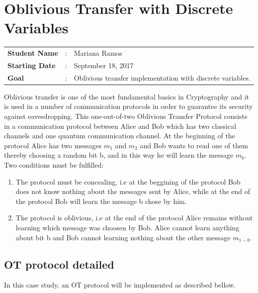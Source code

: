 \clearpage
\section{Oblivious Transfer with Discrete Variables}

\begin{tcolorbox}	
\begin{tabular}{p{2.75cm} p{0.2cm} p{10.5cm}} 	
\textbf{Student Name}  &:& Mariana Ramos\\
\textbf{Starting Date} &:& September 18, 2017\\
\textbf{Goal}          &:& Oblivious transfer implementation with discrete variables.
\end{tabular}
\end{tcolorbox}

Oblivious transfer is one of the most fundamental basics in Cryptography and it is used in a number of communication protocols in order to guarantee its security against eavesdropping. This one-out-of-two Oblivious Transfer Protocol consists in a communication protocol between Alice and Bob which has two classical channels and one quantum communication channel. At the beginning of the protocol Alice has two messages $m_1$ and $m_2$ and Bob wants to read one of them thereby choosing a random bit b, and in this way he will learn the message $m_{b}$. Two conditions must be fulfilled:
\begin{enumerate}
	\item{The protocol must be concealing, i.e at the beggining of the protocol Bob does not know nothing about the messages sent by Alice, while at the end of the protocol Bob will learn the message b chose by him.}
	\item{The protocol is oblivious, i.e at the end of the protocol Alice remains without learning which message was choosen by Bob. Alice cannot learn anything about bit b and Bob cannot learning nothing about the other message $m_{1-b}.$}
\end {enumerate}

\subsection{OT protocol detailed}
In this case study, an OT protocol will be implemented as described bellow. 

